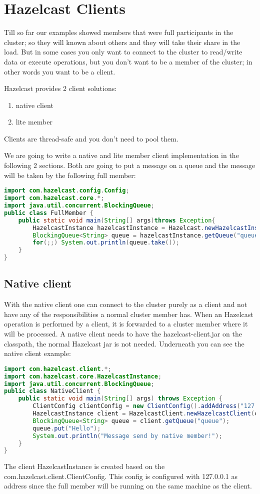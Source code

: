 \chapter{Hazelcast Clients}

Till so far our examples showed members that were full participants in the cluster; so they will known about others and they will take their share in the load. But in some cases you only want to connect to the cluster to read/write data or execute operations, but you don't want to be a member of the cluster; in other words you want to be a client.

Hazelcast provides 2 client solutions:
\begin{enumerate}
\item native client
\item lite member
\end{enumerate}
Clients are thread-safe and you don't need to pool them.

We are going to write a native and lite member client implementation in the following 2 sections. Both are going to put a message on a queue and the message will be taken by the following full member:
\begin{lstlisting}[language=java]
import com.hazelcast.config.Config;
import com.hazelcast.core.*;
import java.util.concurrent.BlockingQueue;
public class FullMember {
    public static void main(String[] args)throws Exception{
        HazelcastInstance hazelcastInstance = Hazelcast.newHazelcastInstance(null);
        BlockingQueue<String> queue = hazelcastInstance.getQueue("queue");
        for(;;) System.out.println(queue.take());
    }
}
\end{lstlisting}
\section{Native client}
With the native client one can connect to the cluster purely as a client and not have any of the responsibilities a normal cluster member has. When an Hazelcast operation is performed by a client, it is forwarded to a cluster member where it will be processed. A native client needs to have the hazelcast-client.jar on the classpath, the normal Hazelcast jar is not needed. Underneath you can see the native client example:
\begin{lstlisting}[language=java]
import com.hazelcast.client.*;
import com.hazelcast.core.HazelcastInstance;
import java.util.concurrent.BlockingQueue;
public class NativeClient {
    public static void main(String[] args) throws Exception {
        ClientConfig clientConfig = new ClientConfig().addAddress("127.0.0.1");
        HazelcastInstance client = HazelcastClient.newHazelcastClient(clientConfig);
        BlockingQueue<String> queue = client.getQueue("queue");
        queue.put("Hello");
        System.out.println("Message send by native member!");
    }
}
\end{lstlisting}
The client HazelcastInstance is created based on the com.hazelcast.client.ClientConfig. This config is configured with 127.0.0.1 as address since the full member will be running on the same machine as the client.

